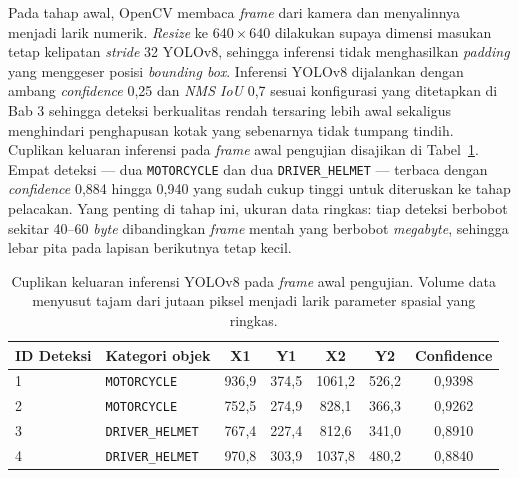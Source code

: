 Pada tahap awal, OpenCV membaca \textit{frame} dari kamera dan menyalinnya menjadi larik numerik. \textit{Resize} ke $640 \times 640$ dilakukan supaya dimensi masukan tetap kelipatan \textit{stride} 32 YOLOv8, sehingga inferensi tidak menghasilkan \textit{padding} yang menggeser posisi \textit{bounding box}. Inferensi YOLOv8 dijalankan dengan ambang \textit{confidence} 0,25 dan \textit{NMS IoU} 0,7 sesuai konfigurasi yang ditetapkan di Bab 3 sehingga deteksi berkualitas rendah tersaring lebih awal sekaligus menghindari penghapusan kotak yang sebenarnya tidak tumpang tindih. Cuplikan keluaran inferensi pada \textit{frame} awal pengujian disajikan di Tabel~\ref{tab:output-yolo}. Empat deteksi --- dua \texttt{MOTORCYCLE} dan dua \texttt{DRIVER\_HELMET} --- terbaca dengan \textit{confidence} 0,884 hingga 0,940 yang sudah cukup tinggi untuk diteruskan ke tahap pelacakan. Yang penting di tahap ini, ukuran data ringkas: tiap deteksi berbobot sekitar 40--60 \textit{byte} dibandingkan \textit{frame} mentah yang berbobot \textit{megabyte}, sehingga lebar pita pada lapisan berikutnya tetap kecil.

\begin{table}[htbp]
\centering
\caption{Cuplikan keluaran inferensi YOLOv8 pada \textit{frame} awal pengujian. Volume data menyusut tajam dari jutaan piksel menjadi larik parameter spasial yang ringkas.}
\label{tab:output-yolo}
\footnotesize
\setlength{\tabcolsep}{3pt}
\begin{tabular}{p{1.4cm} p{3.2cm} c c c c c}
\toprule
\textbf{ID Deteksi} & \textbf{Kategori objek} & \textbf{X1} & \textbf{Y1} & \textbf{X2} & \textbf{Y2} & \textbf{Confidence} \\
\midrule
1 & \texttt{MOTORCYCLE}      & 936{,}9  & 374{,}5 & 1061{,}2 & 526{,}2 & 0{,}9398 \\
2 & \texttt{MOTORCYCLE}      & 752{,}5  & 274{,}9 &  828{,}1 & 366{,}3 & 0{,}9262 \\
3 & \texttt{DRIVER\_HELMET}  & 767{,}4  & 227{,}4 &  812{,}6 & 341{,}0 & 0{,}8910 \\
4 & \texttt{DRIVER\_HELMET}  & 970{,}8  & 303{,}9 & 1037{,}8 & 480{,}2 & 0{,}8840 \\
\bottomrule
\end{tabular}
\end{table}

